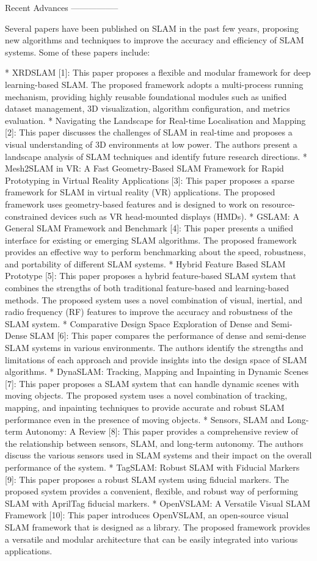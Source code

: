 \documentclass[conference]{IEEEtran}
\begin{document}
Recent Advances
-----------------

Several papers have been published on SLAM in the past few years, proposing new algorithms and techniques to improve the accuracy and efficiency of SLAM systems. Some of these papers include:

* XRDSLAM [1]: This paper proposes a flexible and modular framework for deep learning-based SLAM. The proposed framework adopts a multi-process running mechanism, providing highly reusable foundational modules such as unified dataset management, 3D visualization, algorithm configuration, and metrics evaluation.
* Navigating the Landscape for Real-time Localisation and Mapping [2]: This paper discusses the challenges of SLAM in real-time and proposes a visual understanding of 3D environments at low power. The authors present a landscape analysis of SLAM techniques and identify future research directions.
* Mesh2SLAM in VR: A Fast Geometry-Based SLAM Framework for Rapid Prototyping in Virtual Reality Applications [3]: This paper proposes a sparse framework for SLAM in virtual reality (VR) applications. The proposed framework uses geometry-based features and is designed to work on resource-constrained devices such as VR head-mounted displays (HMDs).
* GSLAM: A General SLAM Framework and Benchmark [4]: This paper presents a unified interface for existing or emerging SLAM algorithms. The proposed framework provides an effective way to perform benchmarking about the speed, robustness, and portability of different SLAM systems.
* Hybrid Feature Based SLAM Prototype [5]: This paper proposes a hybrid feature-based SLAM system that combines the strengths of both traditional feature-based and learning-based methods. The proposed system uses a novel combination of visual, inertial, and radio frequency (RF) features to improve the accuracy and robustness of the SLAM system.
* Comparative Design Space Exploration of Dense and Semi-Dense SLAM [6]: This paper compares the performance of dense and semi-dense SLAM systems in various environments. The authors identify the strengths and limitations of each approach and provide insights into the design space of SLAM algorithms.
* DynaSLAM: Tracking, Mapping and Inpainting in Dynamic Scenes [7]: This paper proposes a SLAM system that can handle dynamic scenes with moving objects. The proposed system uses a novel combination of tracking, mapping, and inpainting techniques to provide accurate and robust SLAM performance even in the presence of moving objects.
* Sensors, SLAM and Long-term Autonomy: A Review [8]: This paper provides a comprehensive review of the relationship between sensors, SLAM, and long-term autonomy. The authors discuss the various sensors used in SLAM systems and their impact on the overall performance of the system.
* TagSLAM: Robust SLAM with Fiducial Markers [9]: This paper proposes a robust SLAM system using fiducial markers. The proposed system provides a convenient, flexible, and robust way of performing SLAM with AprilTag fiducial markers.
* OpenVSLAM: A Versatile Visual SLAM Framework [10]: This paper introduces OpenVSLAM, an open-source visual SLAM framework that is designed as a library. The proposed framework provides a versatile and modular architecture that can be easily integrated into various applications.
\end{document}

